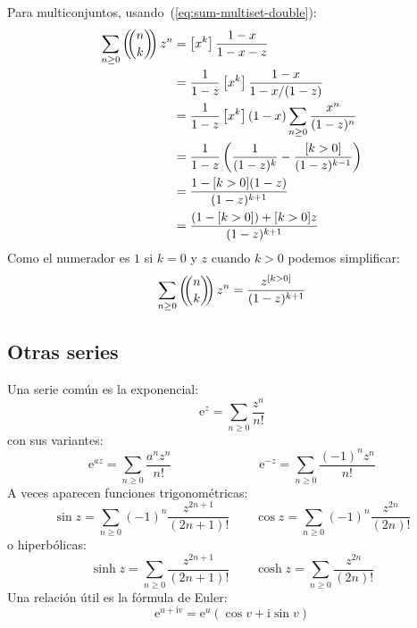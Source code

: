   Para multiconjuntos,%
  usando~(\ref{eq:sum-multiset-double}):
  \begin{align*}
    \sum_{n \ge 0} \left( \!\! \binom{n}{k} \!\! \right) z^n
      &= \left[ x^k \right] \frac{1 - x}{1 - x - z} \\
      &= \frac{1}{1 - z}
	   \left[ x^k \right] \frac{1 - x}{1 - x / (1 - z)} \\
      &= \frac{1}{1 - z}
	   \left[ x^k \right] (1 - x)
	     \sum_{n \ge 0} \frac{x^n}{(1 - z)^n}
	      \\
      &= \frac{1}{1 - z}
	   \left(
	     \frac{1}{(1 - z)^k} - \frac{[k > 0]}{(1 - z)^{k - 1}}
	   \right)  \\
      &= \frac{1 - [k > 0] (1 - z)}{(1 - z)^{k + 1}} \\
      &= \frac{(1 - [k > 0]) + [k > 0] z}{(1 - z)^{k + 1}}
  \end{align*}
  Como el numerador es \(1\) si \(k = 0\) y \(z\) cuando \(k > 0\)
  podemos simplificar:
  \begin{equation}
    \label{eq:serie-multiset-n}
    \sum_{n \ge 0} \left( \!\! \binom{n}{k} \!\! \right) z^n
      = \frac{z^{[k > 0]}}{(1 - z)^{k + 1}}
  \end{equation}

\subsection{Otras series}
\label{sec:otras-series}

  Una serie común es la exponencial:%
  \begin{equation}
    \label{eq:exponencial}
    \mathrm{e}^z
      = \sum_{n \ge 0} \frac{z^n}{n!}
  \end{equation}
  con sus variantes:
  \begin{equation*}
    \mathrm{e}^{a z}
      = \sum_{n \ge 0} \frac{a^n z^n}{n!} \hspace{7em}
    \mathrm{e}^{-z}
      = \sum_{n \ge 0} \frac{(-1)^n z^n}{n!}
  \end{equation*}
  A veces aparecen funciones trigonométricas:%
  \begin{equation*}
    \sin z
      = \sum_{n \ge 0} (-1)^n \frac{z^{2 n + 1}}{(2 n + 1)!} \qquad
    \cos z
      = \sum_{n \ge 0} (-1)^n \frac{z^{2 n}}{(2 n)!}
  \end{equation*}
  o hiperbólicas:%
  \begin{equation*}
    \sinh z
      = \sum_{n \ge 0} \frac{z^{2 n + 1}}{(2 n + 1)!} \qquad
    \cosh z
      = \sum_{n \ge 0} \frac{z^{2 n}}{(2 n)!}
  \end{equation*}
  Una relación útil es la fórmula de Euler:%
  \begin{equation}
    \label{eq:formula-Euler-exponencial}
    \mathrm{e}^{u + \mathrm{i} v}
      = \mathrm{e}^u (\cos v + \mathrm{i} \sin v)
  \end{equation}

